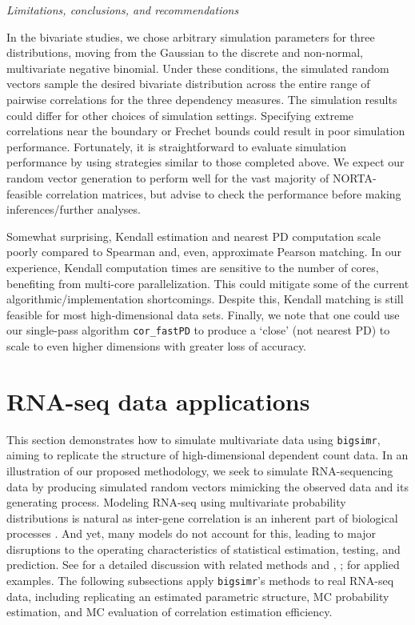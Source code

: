 \documentclass[
]{jss}
\begin{document}
\emph{Limitations, conclusions, and recommendations}

In the bivariate studies, we chose arbitrary simulation parameters for three distributions, moving from the Gaussian to the discrete and non-normal, multivariate negative binomial. Under these conditions, the simulated random vectors sample the desired bivariate distribution across the entire range of pairwise correlations for the three dependency measures. The simulation results could differ for other choices of simulation settings. Specifying extreme correlations near the boundary or Frechet bounds could result in poor simulation performance. Fortunately, it is straightforward to evaluate simulation performance by using strategies similar to those completed above. We expect our random vector generation to perform well for the vast majority of NORTA-feasible correlation matrices, but advise to check the performance before making inferences/further analyses.

Somewhat surprising, Kendall estimation and nearest PD computation scale poorly compared to Spearman and, even, approximate Pearson matching. In our experience, Kendall computation times are sensitive to the number of cores, benefiting from multi-core parallelization. This could mitigate some of the current algorithmic/implementation shortcomings. Despite this, Kendall matching is still feasible for most high-dimensional data sets. Finally, we note that one could use our single-pass algorithm \texttt{cor\_fastPD} to produce a `close' (not nearest PD) to scale to even higher dimensions with greater loss of accuracy.

\hypertarget{examples}{%
\section{RNA-seq data applications}\label{examples}}

This section demonstrates how to simulate multivariate data using \texttt{bigsimr}, aiming to replicate the structure of high-dimensional dependent count data. In an illustration of our proposed methodology, we seek to simulate RNA-sequencing data by producing simulated random vectors mimicking the observed data and its generating process. Modeling RNA-seq using multivariate probability distributions is natural as inter-gene correlation is an inherent part of biological processes \citep{Wang2009b}. And yet, many models do not account for this, leading to major disruptions to the operating characteristics of statistical estimation, testing, and prediction. See \citet{Efron2012} for a detailed discussion with related methods and \citet{Wu2012b}, \citet{Schissler2018}; \citet{Schissler2019} for applied examples. The following subsections apply \texttt{bigsimr}'s methods to real RNA-seq data, including replicating an estimated parametric structure, MC probability estimation, and MC evaluation of correlation estimation efficiency.
\end{document}
